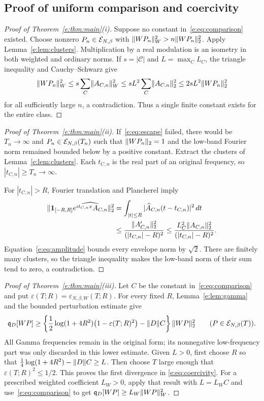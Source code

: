 \documentclass[11pt,a4paper]{article}
\numberwithin{equation}{section}
\theoremstyle{definition}\newtheorem{definition}[theorem]{Definition}
\theoremstyle{remark}\newtheorem{remark}[theorem]{Remark}
\newcommand{\qD}{\mathfrak q_D}\newcommand{\qth}{\mathfrak q_\theta}
\begin{document}
\subsection{Proof of uniform comparison and coercivity}\label{e:sec:proof}

\begin{proof}[Proof of Theorem~\ref{e:thm:main}\textup{(i)}]
Suppose no constant in~\eqref{e:eq:comparison} existed. Choose nonzero
$P_n\in\mathcal E_{N,\beta}$ with $\lVert WP_n\rVert_W^2>n\lVert WP_n\rVert_2^2$. Apply
Lemma~\ref{e:lem:clusters}. Multiplication by a real modulation is an
isometry in both weighted and ordinary norms. If $s=|\mathcal C|$ and
$L=\max_C L_C$, the triangle inequality and Cauchy--Schwarz give
\[
 \lVert WP_n\rVert_W^2\le s\sum_C\lVert A_{C,n}\rVert_W^2
 \le sL^2\sum_C\lVert A_{C,n}\rVert_2^2
 \le2sL^2\lVert WP_n\rVert_2^2
\]
for all sufficiently large $n$, a contradiction. Thus a single finite
constant exists for the entire class.
\end{proof}

\begin{proof}[Proof of Theorem~\ref{e:thm:main}\textup{(ii)}]
If~\eqref{e:eq:escape} failed, there would be $T_n\to\infty$ and
$P_n\in\mathcal E_{N,\beta}(T_n)$ such that $\lVert WP_n\rVert_2=1$ and the low-band Fourier
norm remained bounded below by a positive constant. Extract the clusters
of Lemma~\ref{e:lem:clusters}. Each $t_{C,n}$ is the real part of an original
frequency, so $|t_{C,n}|\ge T_n\to\infty$.

For $|t_{C,n}|>R$, Fourier translation and Plancherel imply
\begin{align}\label{e:eq:low-band}
 \lVert\mathbf1_{[-R,R]}
 \widehat{e^{it_{C,n}x}A_{C,n}}\rVert_2^2
 &=\int_{|t|\le R}|\widehat A_{C,n}(t-t_{C,n})|^2\,dt\notag\\
 &\le\frac{\lVert A_{C,n}'\rVert_2^2}{(|t_{C,n}|-R)^2}
 \le\frac{L_C^2\lVert A_{C,n}\rVert_2^2}{(|t_{C,n}|-R)^2}.
\end{align}
Equation~\eqref{e:eq:amplitude} bounds every envelope norm by $\sqrt2$.
There are finitely many clusters, so the triangle inequality makes the
low-band norm of their sum tend to zero, a contradiction.
\end{proof}

\begin{proof}[Proof of Theorem~\ref{e:thm:main}\textup{(iii)}]
Let $C$ be the constant in~\eqref{e:eq:comparison} and put
$\varepsilon(T;R)=\varepsilon_{N,\beta,W}(T;R)$. For every fixed $R$,
Lemma~\ref{e:lem:gamma} and the bounded perturbation estimate give
\begin{equation}\label{e:eq:master-lower}
 \qD[WP]\ge\left\{
 \frac12\log(1+4R^2)\bigl(1-\varepsilon(T;R)^2\bigr)
 -\norm D C\right\}\norm{WP}_2^2
 \qquad(P\in\EE(T)).
\end{equation}
All Gamma frequencies remain in the original form; its nonnegative
low-frequency part was only discarded in this lower estimate. Given
$L>0$, first choose $R$ so that
$\tfrac14\log(1+4R^2)-\lVert D\rVert C\ge L$. Then choose $T$ large enough
that $\varepsilon(T;R)^2\le1/2$. This proves the first divergence in
\eqref{e:eq:coercivity}. For a prescribed weighted coefficient $L_W>0$,
apply that result with $L=L_W C$ and use~\eqref{e:eq:comparison} to get
$\qD[WP]\ge L_W\norm{WP}_W^2$.
\end{proof}
\end{document}
